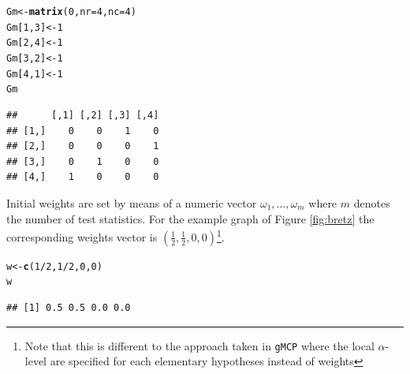 \documentclass[a4paper, 11pt]{article}\usepackage[]{graphicx}\usepackage[]{color}
\makeatletter
\newcommand{\hlnum}[1]{\textcolor[rgb]{0.686,0.059,0.569}{#1}}%
\newcommand{\hlopt}[1]{\textcolor[rgb]{0,0,0}{#1}}%
\newcommand{\hlstd}[1]{\textcolor[rgb]{0.345,0.345,0.345}{#1}}%
\newcommand{\hlkwb}[1]{\textcolor[rgb]{0.69,0.353,0.396}{#1}}%
\newcommand{\hlkwc}[1]{\textcolor[rgb]{0.333,0.667,0.333}{#1}}%
\newcommand{\hlkwd}[1]{\textcolor[rgb]{0.737,0.353,0.396}{\textbf{#1}}}%
\newenvironment{kframe}{%
 \def\at@end@of@kframe{}%
 \ifinner\ifhmode%
  \def\at@end@of@kframe{\end{minipage}}%
  \begin{minipage}{\columnwidth}%
 \fi\fi%
 \def\FrameCommand##1{\hskip\@totalleftmargin \hskip-\fboxsep
 \colorbox{shadecolor}{##1}\hskip-\fboxsep
     \hskip-\linewidth \hskip-\@totalleftmargin \hskip\columnwidth}%
 \MakeFramed {\advance\hsize-\width
   \@totalleftmargin\z@ \linewidth\hsize
   \@setminipage}}%
 {\par\unskip\endMakeFramed%
 \at@end@of@kframe}
\newenvironment{knitrout}{}{} %
\newcommand{\al}{$\alpha$-level\xspace}
\makeatother
\begin{document}
\begin{knitrout}
\color{fgcolor}\begin{kframe}
\begin{alltt}
\hlstd{Gm} \hlkwb{<-} \hlkwd{matrix}\hlstd{(}\hlnum{0}\hlstd{,} \hlkwc{nr} \hlstd{=} \hlnum{4}\hlstd{,} \hlkwc{nc} \hlstd{=} \hlnum{4}\hlstd{)}
\hlstd{Gm[}\hlnum{1}\hlstd{,} \hlnum{3}\hlstd{]} \hlkwb{<-} \hlnum{1}
\hlstd{Gm[}\hlnum{2}\hlstd{,} \hlnum{4}\hlstd{]} \hlkwb{<-} \hlnum{1}
\hlstd{Gm[}\hlnum{3}\hlstd{,} \hlnum{2}\hlstd{]} \hlkwb{<-} \hlnum{1}
\hlstd{Gm[}\hlnum{4}\hlstd{,} \hlnum{1}\hlstd{]} \hlkwb{<-} \hlnum{1}
\hlstd{Gm}
\end{alltt}
\begin{verbatim}
##      [,1] [,2] [,3] [,4]
## [1,]    0    0    1    0
## [2,]    0    0    0    1
## [3,]    0    1    0    0
## [4,]    1    0    0    0
\end{verbatim}
\end{kframe}
\end{knitrout}


Initial weights are set by means of a numeric vector
$\omega_1,...,\omega_m$ where $m$ denotes the number of test
statistics. For the example graph of Figure \ref{fig:bretz} the
corresponding weights vector is
$(\frac{1}{2},\frac{1}{2},0,0)$\footnote{Note that this is
  different to the approach taken in \texttt{gMCP} where the local \al
  are specified for each elementary hypotheses instead of
  weights}. 

\begin{knitrout}
\color{fgcolor}\begin{kframe}
\begin{alltt}
\hlstd{w} \hlkwb{<-} \hlkwd{c}\hlstd{(}\hlnum{1}\hlopt{/}\hlnum{2}\hlstd{,} \hlnum{1}\hlopt{/}\hlnum{2}\hlstd{,} \hlnum{0}\hlstd{,} \hlnum{0}\hlstd{)}
\hlstd{w}
\end{alltt}
\begin{verbatim}
## [1] 0.5 0.5 0.0 0.0
\end{verbatim}
\end{kframe}
\end{knitrout}
\end{document}
